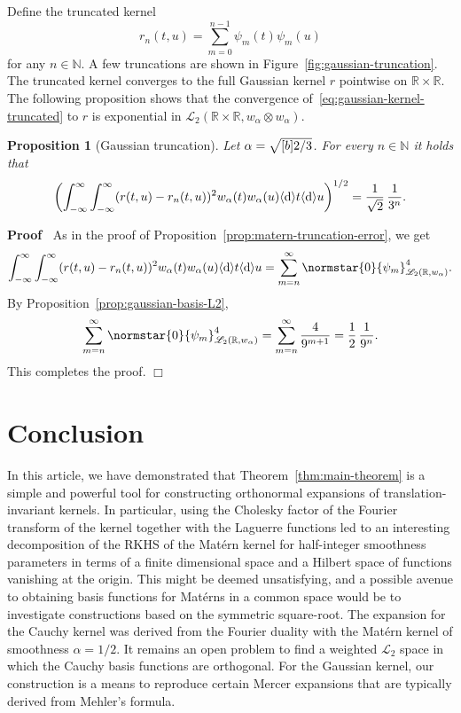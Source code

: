 \documentclass{article}
\newcommand{\mathd}{\mathrm{d}}
\newenvironment{proof}{\noindent\textbf{Proof\ }}{\hspace*{\fill}$\Box$\medskip}
{\theorembodyfont{\rmfamily}\newtheorem{example}{Example}}
\newtheorem{proposition}{Proposition}
{\theorembodyfont{\rmfamily}\newtheorem{remark}{Remark}}
\newcommand{\R}{\mathbb{R}}
\newcommand{\N}{\mathbb{N}}
\newcommand{\dif}{ \langle \mathd \rangle }
\begin{document}
Define the truncated kernel
\begin{equation}
  \label{eq:gaussian-kernel-truncated} r_n (t, u) = \sum_{m = 0}^{n - 1}
  \psi_m (t) \psi_m (u)
\end{equation}
for any $n \in \N$. A few truncations are shown in 
Figure~\ref{fig:gaussian-truncation}. The truncated kernel converges to the
full Gaussian kernel $r$ pointwise on $\R \times \R$. The following
proposition shows that the convergence of~\eqref{eq:gaussian-kernel-truncated}
to $r$ is exponential in $\mathscr{L}_2 (\R \times \R, w_{\alpha} \otimes
w_{\alpha})$.

\begin{proposition}
  [Gaussian truncation]\label{prop:gaussian-truncation-error}Let $\alpha =
  \sqrt{\smash{[} b] 2 / 3}$. For every $n \in \N$ it holds that
  \[ \left( \int_{- \infty}^{\infty} \int_{- \infty}^{\infty} (r (t, u) - r_n
     (t, u))^2 w_{\alpha} (t) w_{\alpha} (u) \dif t \dif u \right)^{1 / 2} =
     \frac{1}{\sqrt{2}}  \hspace{0.17em} \frac{1}{3^n} . \]
\end{proposition}

\begin{proof}
  As in the proof of  Proposition~\ref{prop:matern-truncation-error}, we get
  \[ \int_{- \infty}^{\infty} \int_{- \infty}^{\infty} (r (t, u) - r_n (t,
     u))^2 w_{\alpha} (t) w_{\alpha} (u) \dif t \dif u = \sum_{m = n}^{\infty}
     \normstar{0}{\psi_m}_{\mathscr{L}_2 (\R, w_{\alpha})}^4 . \]
  By  Proposition~\ref{prop:gaussian-basis-L2},
  \[ \sum_{m = n}^{\infty} \normstar{0}{\psi_m}_{\mathscr{L}_2 (\R,
     w_{\alpha})}^4 = \sum_{m = n}^{\infty} \frac{4}{9^{m + 1}} = \frac{1}{2} 
     \hspace{0.17em} \frac{1}{9^n} . \]
  This completes the proof.
\end{proof}

\section{Conclusion}

In this article, we have demonstrated that  Theorem~\ref{thm:main-theorem} is
a simple and powerful tool for constructing orthonormal expansions of
translation-invariant kernels. In particular, using the Cholesky factor of the
Fourier transform of the kernel together with the Laguerre functions led to an
interesting decomposition of the RKHS of the Mat{\'e}rn kernel for
half-integer smoothness parameters in terms of a finite dimensional space and
a Hilbert space of functions vanishing at the origin. This might be deemed
unsatisfying, and a possible avenue to obtaining basis functions for
Mat{\'e}rns in a common space would be to investigate constructions based on
the symmetric square-root. The expansion for the Cauchy kernel was derived
from the Fourier duality with the Mat{\'e}rn kernel of smoothness $\alpha = 1
/ 2$. It remains an open problem to find a weighted $\mathscr{L}_2$ space in
which the Cauchy basis functions are orthogonal. For the Gaussian kernel, our
construction is a means to reproduce certain Mercer expansions that are
typically derived from Mehler's formula.
\end{document}

